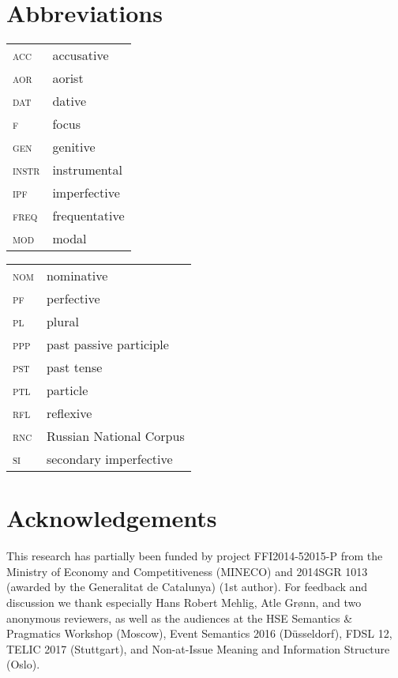 \documentclass[output=paper,modfonts,newtxmath,hidelinks]{langscibook}
\begin{document}
\section*{Abbreviations}

\begin{tabularx}{.5\textwidth}{@{}lQ@{}}
\textsc{acc}&{accusative}\\
\textsc{aor}&aorist\\
\textsc{dat}&{dative}\\
\textsc{f}&focus\\
\textsc{gen}&{genitive}\\
\textsc{instr}&{instrumental}\\
\textsc{ipf}&{imperfective}\\
\textsc{freq}&frequentative\\
\textsc{mod}&modal\\
\end{tabularx}%
\begin{tabularx}{.5\textwidth}{@{}lQ@{}}
\textsc{nom}&{nominative}\\
\textsc{pf}&{perfective}\\
\textsc{pl}&{plural}\\
\textsc{ppp}&{past} passive {participle}\\
\textsc{pst}&{{past} tense}\\ 
\textsc{ptl}&particle\\
\textsc{rfl}&reflexive\\
\textsc{rnc}&{Russian} National Corpus\\
\textsc{si}&secondary {imperfective}\\
\end{tabularx}


\section*{Acknowledgements}

This research has partially been funded by project FFI2014-52015-P from the Ministry of Economy and Competitiveness (MINECO) and 2014SGR 1013 (awarded by the Generalitat de Catalunya) (1st author). For feedback and discussion we thank especially Hans Robert Mehlig, Atle Grønn, and  two anonymous reviewers, as well as the audiences at the HSE Semantics \& Pragmatics Workshop (Moscow), Event Semantics 2016 (D\"{u}sseldorf), FDSL 12, TELIC 2017 (Stuttgart), and Non-at-Issue Meaning and Information Structure (Oslo).

\largerpage
\sloppy\printbibliography[heading=subbibliography,notkeyword=this]
\end{document}
